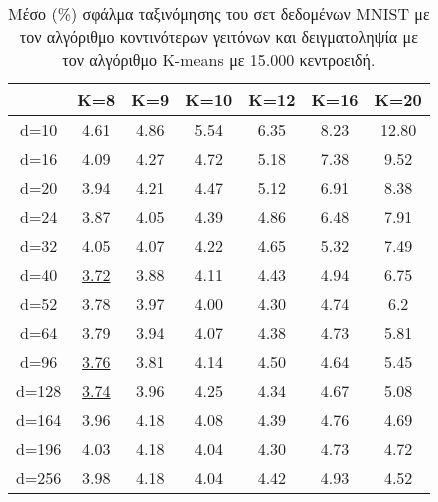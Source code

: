 \begin{table}[H]
\singlespacing
\centering
\label{tab:table6}
\caption{Μέσο (\%) σφάλμα ταξινόμησης του σετ δεδομένων \textlatin{MNIST} με τον αλγόριθμο κοντινότερων γειτόνων και δειγματοληψία με τον αλγόριθμο \textlatin{K-means} με 15.000 κεντροειδή.}
\vspace*{5mm}
\begin{tabular}{|c|c|c|c|c|c|c|}
\hline
& K=8 & K=9 & K=10 & K=12 & K=16 & K=20 \\
\hline
d=10 & 4.61 & 4.86 & 5.54 & 6.35 & 8.23 & 12.80 \\
d=16 & 4.09 & 4.27 & 4.72 & 5.18 & 7.38 & 9.52 \\
d=20 & 3.94 & 4.21 & 4.47 & 5.12 & 6.91 & 8.38 \\
d=24 & 3.87 & 4.05 & 4.39 & 4.86 & 6.48 & 7.91 \\
d=32 & 4.05 & 4.07 & 4.22 & 4.65 & 5.32 & 7.49 \\
d=40 & \underline{3.72} & 3.88 & 4.11 & 4.43 & 4.94 & 6.75 \\
d=52 & 3.78 & 3.97 & 4.00 & 4.30 & 4.74 & 6.2 \\
d=64 & 3.79 & 3.94 & 4.07 & 4.38 & 4.73 & 5.81 \\
d=96 & \underline{3.76} & 3.81 & 4.14 & 4.50 & 4.64 & 5.45 \\
d=128 & \underline{3.74} & 3.96 & 4.25 & 4.34 & 4.67 & 5.08 \\
d=164 & 3.96 & 4.18 & 4.08 & 4.39 & 4.76 & 4.69 \\
d=196 & 4.03 & 4.18 & 4.04 & 4.30 & 4.73 & 4.72 \\
d=256 & 3.98 & 4.18 & 4.04 & 4.42 & 4.93 & 4.52 \\
\hline
\end{tabular}
\end{table}

